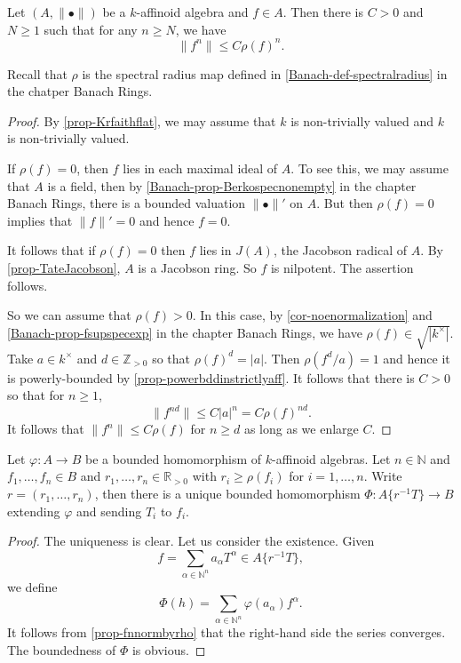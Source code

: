 \begin{proposition}\label{prop-fnnormbyrho}
    Let $(A,\|\bullet\|)$ be a $k$-affinoid algebra and $f\in A$. Then there is $C>0$ and $N\geq 1$ such that for any $n\geq N$, we have
    \[
        \|f^n\|\leq C\rho(f)^n.  
    \]
\end{proposition}
Recall that $\rho$ is the spectral radius map defined in \cref{Banach-def-spectralradius} in the chatper Banach Rings.
\begin{proof}
    By \cref{prop-Krfaithflat}, we may assume that $k$ is non-trivially valued and $k$ is non-trivially valued.
    
    If $\rho(f)=0$, then $f$ lies in each maximal ideal of $A$. To see this, we may assume that $A$ is a field, then by \cref{Banach-prop-Berkospecnonempty} in the chapter Banach Rings, there is a bounded valuation $\|\bullet\|'$ on $A$. But then $\rho(f)=0$ implies that $\|f\|'=0$ and hence $f=0$.

    It follows that if $\rho(f)=0$ then $f$ lies in $J(A)$, the Jacobson radical of $A$. By \cref{prop-TateJacobson}, $A$ is a Jacobson ring. So $f$ is nilpotent. The assertion follows.

    So we can assume that $\rho(f)>0$. In this case, by \cref{cor-noenormalization} and \cref{Banach-prop-fsupspecexp} in the chapter Banach Rings, we have $\rho(f)\in \sqrt{|k^{\times}|}$. Take $a\in k^{\times}$ and $d\in \mathbb{Z}_{>0}$ so that $\rho(f)^d=|a|$. Then $\rho(f^d/a)=1$ and hence it is powerly-bounded by \cref{prop-powerbddinstrictlyaff}. It follows that there is $C>0$ so that for $n\geq 1$, 
    \[
        \|f^{nd}\|\leq C |a|^n=C\rho(f)^{nd}. 
    \]
    It follows that $\|f^n\|\leq C\rho(f)$ for $n\geq d$ as long as we enlarge $C$.
\end{proof}


\begin{corollary}\label{cor-univpropTatenonstrict}
    Let $\varphi:A\rightarrow B$ be a bounded homomorphism of $k$-affinoid algebras. Let $n\in \mathbb{N}$ and  $f_1,\ldots,f_n\in B$ and $r_1,\ldots,r_n\in \mathbb{R}_{>0}$ with $r_i\geq \rho(f_i)$ for $i=1,\ldots,n$. Write $r=(r_1,\ldots,r_n)$, then there is a unique bounded homomorphism $\Phi:A\{r^{-1}T\}\rightarrow B$ extending $\varphi$ and sending $T_i$ to $f_i$.
\end{corollary}
\begin{proof}
    The uniqueness is clear. Let us consider the existence. Given 
    \[
        f=\sum_{\alpha\in \mathbb{N}^n} a_{\alpha}T^{\alpha}\in A\{r^{-1}T\}, 
    \]
    we define 
    \[
        \Phi(h)=\sum_{\alpha\in \mathbb{N}^n} \varphi(a_{\alpha})f^{\alpha}. 
    \]
    It follows from \cref{prop-fnnormbyrho} that the right-hand side the series converges. The boundedness of $\Phi$ is obvious.
\end{proof}




